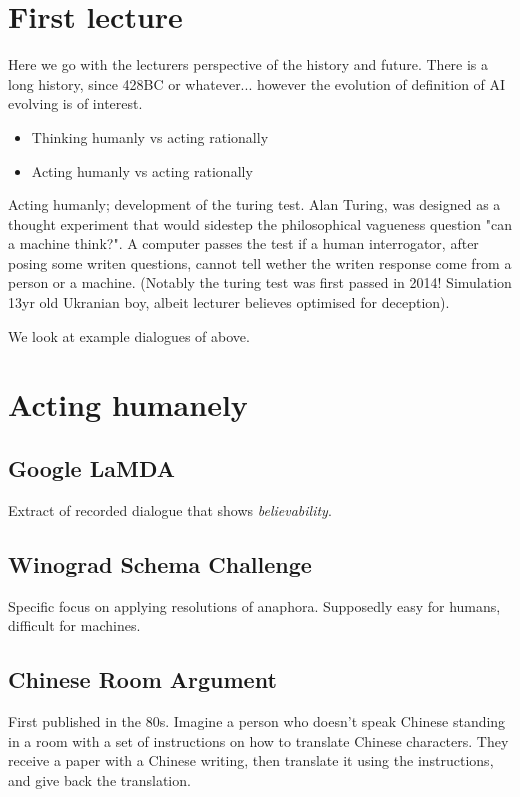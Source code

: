 \documentclass{article}
\begin{document}
\section{First lecture}
Here we go with the lecturers perspective of the history and future. There is a long history, since 428BC or whatever... however the evolution of definition of AI evolving is of interest.

\begin{itemize}
				\item Thinking humanly vs acting rationally
				\item Acting humanly vs acting rationally
\end{itemize}

Acting humanly; development of the turing test. Alan Turing, was designed as a thought experiment that would sidestep the philosophical vagueness question "can a machine think?". A computer passes the test if a human interrogator, after posing some writen questions, cannot tell wether the writen response come from a person or a machine. (Notably the turing test was first passed in 2014! Simulation 13yr old Ukranian boy, albeit lecturer believes optimised for deception).

We look at example dialogues of above.

\section{Acting humanely}

\subsection*{Google LaMDA}
Extract of recorded dialogue that shows \emph{believability}.

\subsection*{Winograd Schema Challenge}
Specific focus on applying resolutions of anaphora. Supposedly easy for humans, difficult for machines.

\subsection*{Chinese Room Argument}
First published in the 80s. Imagine a person who doesn't speak Chinese standing in a room with a set of instructions on how to translate Chinese characters. They receive a paper with a Chinese writing, then translate it using the instructions, and give back the translation.
\end{document}
